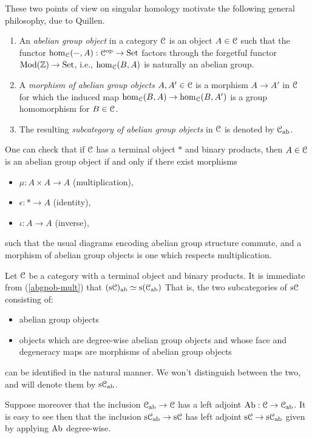 These two points of view on singular homology motivate the following
general philosophy, due to Quillen.

\begin{definitions}
  \begin{enumerate}[leftmargin=*]
  \item An \emph{abelian group object} in a category $\mathcal{C}$ is an object $A
    \in \mathcal{C}$ such that the functor $\operatorname{hom}_{\mathcal{C}}(-,A) : \mathcal{C}^{\mathrm{op}} \to \mathrm{Set}$
    factors through the forgetful functor $\mathrm{Mod}(\mathbb{Z}) \to \mathrm{Set}$, i.e.,
    $\operatorname{hom}_{\mathcal{C}}(B,A)$ is naturally an abelian group.
  \item A \emph{morphism of abelian group objects} $A,A' \in \mathcal{C}$ is a
    morphism $A \to A'$ in $\mathcal{C}$ for which the induced map $\operatorname{hom}_{\mathcal{C}}(B,A)
    \to \operatorname{hom}_{\mathcal{C}}(B,A')$ is a group homomorphism for $B \in \mathcal{C}$.
  \item The resulting \emph{subcategory of abelian group objects} in
    $\mathcal{C}$ is denoted by $\mathcal{C}_{\mathrm{ab}}$.
  \end{enumerate}
\end{definitions}

\begin{nothing}
  \label{abgpob-mult}
  One can check that if $\mathcal{C}$ has a terminal object $*$ and binary
  products, then $A \in \mathcal{C}$ is an abelian group object if and only if
  there exist morphisms
  \begin{itemize}
  \item $\mu : A \times A \to A$ (multiplication),
  \item $\epsilon : * \to A$ (identity),
  \item $\iota : A \to A$ (inverse),
  \end{itemize}
  such that the usual diagrams encoding abelian group structure
  commute, and a morphism of abelian group objects is one which
  respects multiplication.
\end{nothing}

\begin{nothing}
  \label{simplab}
  Let $\mathcal{C}$ be a category with a terminal object and binary
  products. It is immediate from (\ref{abgpob-mult}) that
  $(\mathrm{s}\mathcal{C})_{\mathrm{ab}} \simeq \mathrm{s}(\mathcal{C}_{\mathrm{ab}})$ That is, the two subcategories of
  $\mathrm{s}\mathcal{C}$ consisting of:
  \begin{itemize}
  \item abelian group objects
  \item objects which are degree-wise abelian group objects and whose
    face and degeneracy maps are morphisms of abelian group objects
  \end{itemize}
  can be identified in the natural manner. We won't distinguish
  between the two, and will denote them by $\mathrm{s}\mathcal{C}_{\mathrm{ab}}$.

  Suppose moreover that the inclusion $\mathcal{C}_{\mathrm{ab}} \to \mathcal{C}$ has a left
  adjoint $\operatorname{Ab} : \mathcal{C} \to \mathcal{C}_{\mathrm{ab}}$. It is easy to see then that the
  inclusion $\mathrm{s}\mathcal{C}_{\mathrm{ab}} \to \mathrm{s}\mathcal{C}$ has left adjoint $\mathrm{s}\mathcal{C} \to
  \mathrm{s}\mathcal{C}_{\mathrm{ab}}$ given by applying $\operatorname{Ab}$ degree-wise.
\end{nothing}

